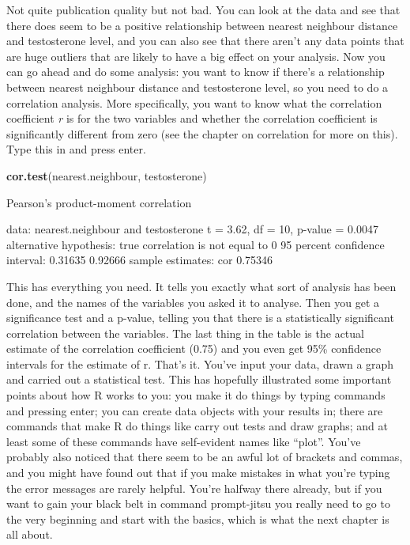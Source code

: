 \documentclass[
]{book}
\newenvironment{Shaded}{\begin{snugshade}}{\end{snugshade}}
\newcommand{\KeywordTok}[1]{\textcolor[rgb]{0.13,0.29,0.53}{\textbf{#1}}}
\newcommand{\NormalTok}[1]{#1}
\newcommand{\StringTok}[1]{\textcolor[rgb]{0.31,0.60,0.02}{#1}}
\begin{document}
Not quite publication quality but not bad. You can look at the data and see that there does seem to be a positive relationship between nearest neighbour distance and testosterone level, and you can also see that there aren't any data points that are huge outliers that are likely to have a big effect on your analysis. Now you can go ahead and do some analysis: you want to know if there's a relationship between nearest neighbour distance and testosterone level, so you need to do a correlation analysis. More specifically, you want to know what the correlation coefficient \emph{r} is for the two variables and whether the correlation coefficient is significantly different from zero (see the chapter on correlation for more on this).
Type this in and press enter.

\begin{Shaded}
\begin{Highlighting}[]
\KeywordTok{cor.test}\NormalTok{(nearest.neighbour, testosterone)}

\NormalTok{    Pearson}\StringTok{'s product-moment correlation}

\StringTok{data:  nearest.neighbour and testosterone}
\StringTok{t = 3.62, df = 10, p-value = 0.0047}
\StringTok{alternative hypothesis: true correlation is not equal to 0}
\StringTok{95 percent confidence interval:}
\StringTok{ 0.31635 0.92666}
\StringTok{sample estimates:}
\StringTok{    cor }
\StringTok{0.75346 }
\end{Highlighting}
\end{Shaded}

This has everything you need. It tells you exactly what sort of analysis has been done, and the names of the variables you asked it to analyse. Then you get a significance test and a p-value, telling you that there is a statistically significant correlation between the variables. The last thing in the table is the actual estimate of the correlation coefficient (0.75) and you even get 95\% confidence intervals for the estimate of r.
That's it. You've input your data, drawn a graph and carried out a statistical test. This has hopefully illustrated some important points about how R works to you: you make it do things by typing commands and pressing enter; you can create data objects with your results in; there are commands that make R do things like carry out tests and draw graphs; and at least some of these commands have self-evident names like ``plot''. You've probably also noticed that there seem to be an awful lot of brackets and commas, and you might have found out that if you make mistakes in what you're typing the error messages are rarely helpful. You're halfway there already, but if you want to gain your black belt in command prompt-jitsu you really need to go to the very beginning and start with the basics, which is what the next chapter is all about.
\end{document}
